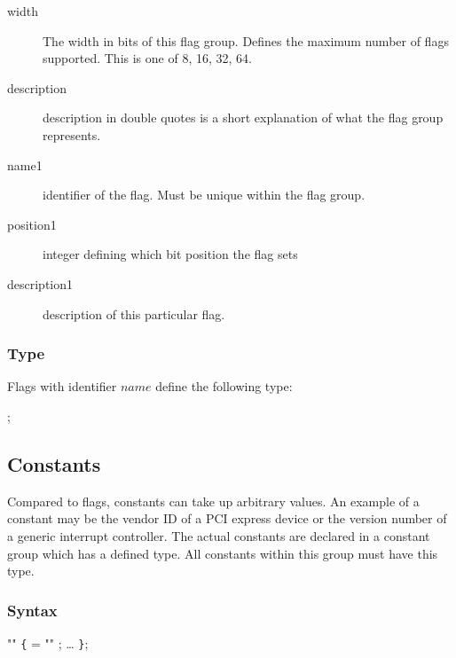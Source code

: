 \documentclass[a4paper,11pt,twoside]{report}
\begin{document}
{{\begin{description}
    \item [width] The width in bits of this flag group. Defines the maximum 
                  number of flags supported. This is one of 8, 16, 32, 64.
    
    \item [description] description in double quotes is a short explanation of
                        what the flag group represents.
    
    \item [name1] identifier of the flag. Must be unique within the flag 
                  group. 
    
    \item [position1] integer defining which bit position the flag sets
    
    \item [description1] description of this particular flag.
\end{description}

\subsubsection{Type}
Flags with identifier $name$ define the following type:
\begin{syntax}
 ;
\end{syntax}



\subsection{Constants}
\label{sec:decl:constants}

Compared to flags, constants can take up arbitrary values. An example of a 
constant may be the vendor ID of a PCI express device or the version number
of a generic interrupt controller. The actual constants are declared in a 
constant group which has a defined type. All constants within this group 
must have this type.

\subsubsection{Syntax}

\begin{syntax}
   "" \verb+{+
     =  "" ;
    \ldots
\verb+}+;
\end{syntax}

}}
\end{document}
